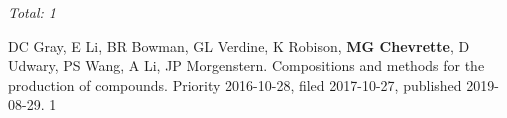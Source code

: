  \vspace{-2mm}

\begin{cvpubs}

\cvpub
{\hspace{-1cm} \textit{Total: 1}} %
{}

\cvpub
{DC Gray, E Li, BR Bowman, GL Verdine, K Robison, \textbf{MG Chevrette}, D Udwary, PS Wang, A Li, JP Morgenstern. Compositions and methods for the production of compounds. Priority 2016-10-28, filed 2017-10-27, published 2019-08-29. \textbf{\textit{}}}
{1}

\end{cvpubs}


 \vspace{-2mm}


